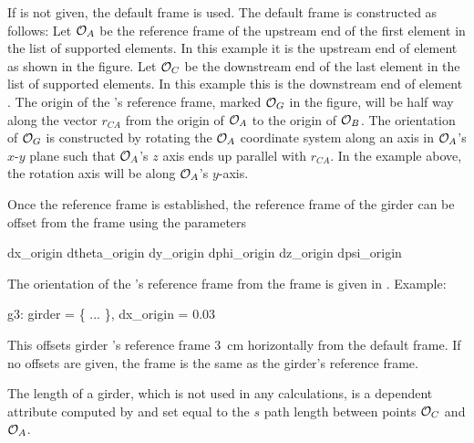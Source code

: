 If  is not given, the default  frame is
used. The default  frame is constructed as follows:
Let ${\cal O}_A$ be the reference frame of the upstream end of
the first element in the list of supported elements. In this example
it is the upstream end of element  as shown in the figure. Let
${\cal O}_C$ be the downstream end of the last element in the list of
supported elements. In this example this is the downstream end of
element . The origin of the 's reference frame,
marked ${\cal O}_G$ in the figure, will be half way along the vector
$r_{CA}$ from the origin of ${\cal O}_A$ to the origin of ${\cal O}_B$.  The
orientation of ${\cal O}_G$ is constructed by rotating the ${\cal O}_A$
coordinate system along an axis in ${\cal O}_A$'s $x$-$y$ plane such that
${\cal O}_A$'s $z$ axis ends up parallel with $r_{CA}$. In the example
above, the rotation axis will be along ${\cal O}_A$'s $y$-axis.

Once the  reference frame is established, the reference
frame of the girder can be offset
from the  frame using the parameters
\begin{example}
  dx_origin    dtheta_origin
  dy_origin    dphi_origin
  dz_origin    dpsi_origin
\end{example} 
The orientation of the 's reference frame from the 
frame is given in . Example:
\begin{example}
  g3: girder = \{ ... \}, dx_origin = 0.03
\end{example}
This offsets girder 's reference frame 3~cm horizontally from
the default  frame. If no offsets are given, the
 frame is the same as the girder's reference frame.

The length  of a girder, which is not used in any calculations,
is a dependent attribute computed by \bmad and set equal to the $s$
path length between points ${\cal O}_C$ and ${\cal O}_A$.

